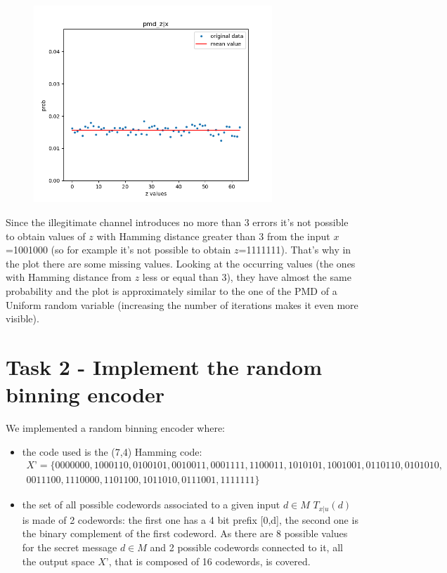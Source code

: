 \documentclass{report}
\begin{document}
\begin{figure}[H]
\centering
\includegraphics[width=0.8\textwidth]{plot1}
\end{figure}

Since the illegitimate channel introduces no more than 3 errors it’s not possible to obtain values of $z$ with Hamming distance greater than 3 from the input $x$=1001000 (so for example it’s not possible to obtain $z$=1111111). That’s why in the plot there are some missing values. Looking at the occurring values (the ones with Hamming distance from $z$ less or equal than 3), they have almost the same probability and the plot is approximately similar to the one of the PMD  of a Uniform random variable (increasing the number of iterations makes it even more visible). 




\section*{Task 2 - Implement the random binning encoder}
We implemented a random binning encoder where: 
\begin{itemize}
\item the code used is the (7,4) Hamming code: 
\begin{equation*}
\begin{aligned}
X’= \{0000000, 1000110, 0100101, 0010011, 0001111, 1100011, 1010101, 1001001,  0110110, 0101010,\\
0011100, 1110000, 1101100, 1011010, 0111001, 1111111\}
\end{aligned}
\end{equation*}
\item the set of all possible codewords associated to a given input $d\in M$ $T_{x|u}(d)$ is made of 2  codewords: the first one has a 4 bit prefix [0,d], the second one is the binary complement of the first codeword. As there are 8 possible values for the secret message $d\in M$ and 2 possible codewords connected to it, all the output space $X’$, that is composed of 16 codewords, is covered. 
\end{itemize}
\end{document}
